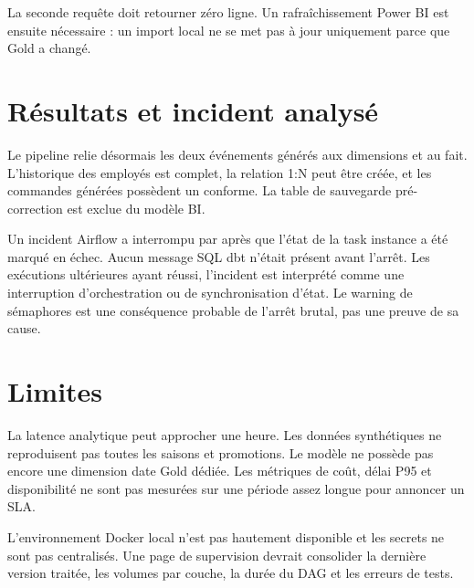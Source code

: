 La seconde requête doit retourner zéro ligne. Un rafraîchissement Power BI est ensuite nécessaire : un import local ne se met pas à jour uniquement parce que Gold a changé.

\section{Résultats et incident analysé}
Le pipeline relie désormais les deux événements générés aux dimensions et au fait. L'historique des employés est complet, la relation 1:N peut être créée, et les commandes générées possèdent un  conforme. La table de sauvegarde pré-correction est exclue du modèle BI.

Un incident Airflow a interrompu  par  après que l'état de la task instance a été marqué en échec. Aucun message SQL dbt n'était présent avant l'arrêt. Les exécutions ultérieures ayant réussi, l'incident est interprété comme une interruption d'orchestration ou de synchronisation d'état. Le warning de sémaphores est une conséquence probable de l'arrêt brutal, pas une preuve de sa cause.

\section{Limites}
La latence analytique peut approcher une heure. Les données synthétiques ne reproduisent pas toutes les saisons et promotions. Le modèle ne possède pas encore une dimension date Gold dédiée. Les métriques de coût, délai P95 et disponibilité ne sont pas mesurées sur une période assez longue pour annoncer un SLA.

L'environnement Docker local n'est pas hautement disponible et les secrets ne sont pas centralisés. Une page de supervision devrait consolider la dernière version traitée, les volumes par couche, la durée du DAG et les erreurs de tests.


